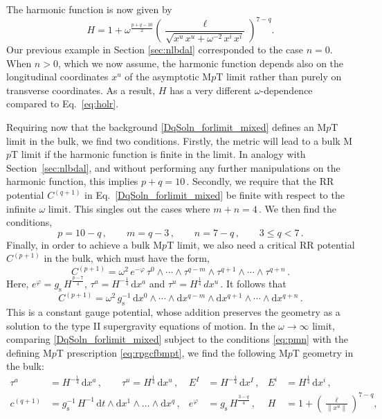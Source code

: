 \documentclass[11pt]{article}
\newcommand{\be}{\begin{equation}}
\newcommand{\ee}{\end{equation}}
\newcommand{\dd}{\mathrm{d}}
\begin{document}
%
The harmonic function is now given by
%
\be \label{eq:hmc}
    H = 1 +  \omega^{\frac{p+q-10}{2}} \left( \frac{\ell}{\sqrt{x^u \, x^u + \omega^{-2} \, x^i \, x^i}} \right)^{\!\!7-q}\!\!.
\ee
%
Our previous example in Section \ref{sec:nlbdal} corresponded to the case $n=0$. 
When $n > 0$, which we now assume, the harmonic function depends also on the longitudinal coordinates $x^u$ of the asymptotic M$p$T limit rather than purely on transverse coordinates.  
As a result, $H$ has a very different $\omega$-dependence compared to Eq.~\eqref{eq:holr}.

Requiring now that the background  \eqref{DqSoln_forlimit_mixed} defines an M$p$T limit in the bulk, we find two conditions.
Firstly, the metric will lead to a bulk M$p$T limit if the harmonic function is finite in the limit.
In analogy with Section~\ref{sec:nlbdal}, 
and without performing any further manipulations on the harmonic function, this implies
%
$p + q = 10$\,.
Secondly, we require that the RR potential $C^{(q+1)}$ in Eq.~\eqref{DqSoln_forlimit_mixed} be finite with respect to the infinite $\omega$ limit. This singles out the cases where
%
$m + n = 4$\,.
%
We then find the conditions,
%
\be \label{eq:pmn}
    p = 10 - q\,,
        \qquad%
    m = q - 3\,,
        \qquad%
    n = 7 - q\,,
        \qquad%
    3 \leq q < 7\,.
\ee
%
Finally, in order to achieve a bulk M$p$T limit, we also need a critical RR potential $C^{(p+1)}$ in the bulk, which must have the form,
%
\be
    C^{(p+1)} = \omega^2 \, e^{-\varphi} \, \tau^0 \wedge \cdots \wedge \tau^{q-m} \wedge \tau^{q+1} \wedge \cdots \wedge \tau^{q+n}\,.
\ee
%
Here, $e^{\varphi} = g^{}_\text{s} \, H^{\frac{p-7}{4}}$, $\tau^a = H^{-\frac{1}{4}} \, \dd x^a$ and $\tau^u = H^{\frac{1}{4}} \, dx^u$\,. It follows that
%
\be
    C^{(p+1)} = \omega^2 \, g^{-1}_\text{s} \, \dd x^0 \wedge \cdots \wedge \dd x^{q-m} \wedge \dd x^{q+1} \wedge \cdots \wedge \dd x^{q+n}\,.
\ee
%
This is a constant gauge potential, 
whose addition preserves the geometry as a solution to the type II supergravity equations of motion. In the $\omega \rightarrow \infty$ limit, comparing \eqref{DqSoln_forlimit_mixed} subject to the conditions \eqref{eq:pmn} with the defining M$p$T prescription \eqref{eq:rpgcfbmpt}, we find the following M$p$T geometry in the bulk:
%
\begin{subequations} \label{eq:gbccf}
\begin{align} 
    \tau^a &= H^{-\frac{1}{4}} \, \dd x^a\,, 
        \qquad%
    \tau^u = H^{\frac{1}{4}} \, \dd x^u\,,
        &%
    E^I &= H^{-\frac{1}{4}} \, \dd x^I\,,
        &%
    E^i &= H^{\frac{1}{4}} \, \dd x^i\,, \label{eq:gbccftau} \\[4pt] 
    c^{(q+1)} & = g_\text{s}^{-1} \, H^{-1} \, \dd t \wedge \dd x^1 \wedge \dots \wedge \dd x^{q} \,,
        &%
    e^\varphi &= g^{}_\text{s} \, H^{\frac{3-q}{4}}\,,
        &%
     H &= 1 + \left( \frac{\ell}{\|x^u\|} \right)^{\!\!7-q}\!\!,
     \label{eq:gbccfh}
\end{align}
\end{subequations}
\end{document}

